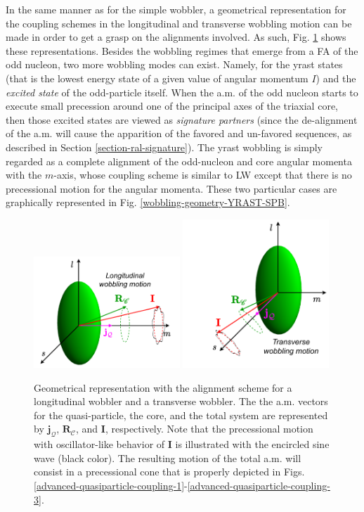In the same manner as for the simple wobbler, a geometrical representation for the coupling schemes in the longitudinal and transverse wobbling motion can be made in order to get a grasp on the alignments involved. As such, Fig. \ref{wobbling-oddA-geometry} shows these representations. Besides the wobbling regimes that emerge from a FA of the odd nucleon, two more wobbling modes can exist. Namely, for the yrast states (that is the lowest energy state of a given value of angular momentum $I$) and the \emph{excited state} of the odd-particle itself. When the a.m. of the odd nucleon starts to execute small precession around one of the principal axes of the triaxial core, then those excited states are viewed as \emph{signature partners} (since the de-alignment of the a.m. will cause the apparition of the favored and un-favored sequences, as described in Section \ref{section-ral-signature}). The yrast wobbling is simply regarded as a complete alignment of the odd-nucleon and core angular momenta with the $m$-axis, whose coupling scheme is similar to LW except that there is no precessional motion for the angular momenta. These two particular cases are graphically represented in Fig. \ref{wobbling-geometry-YRAST-SPB}.
\begin{figure}
    \centering
    \includegraphics[width=0.49\textwidth]{Chapters/Figures/longitudinal_wobbler-schematic.pdf}
    \includegraphics[width=0.49\textwidth]{Chapters/Figures/transverse_wobbler-schematic.pdf}
    \caption{Geometrical representation with the alignment scheme for a longitudinal wobbler and a transverse wobbler. The the a.m. vectors for the quasi-particle, the core, and the total system are represented by $\mathbf{j}_\mathcal{Q}$, $\mathbf{R}_\mathscr{C}$, and $\mathbf{I}$, respectively. Note that the precessional motion with oscillator-like behavior of $\mathbf{I}$ is illustrated with the encircled sine wave (black color). The resulting motion of the total a.m. will consist in a precessional cone that is properly depicted in Figs. \ref{advanced-quasiparticle-coupling-1}-\ref{advanced-quasiparticle-coupling-3}.}
    \label{wobbling-oddA-geometry}
\end{figure}
